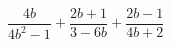 \begin{ex}[type=expression]
	\begin{condition}
		\( \dfrac{4b}{4b^2-1}+\dfrac{2b+1}{3-6b}+\dfrac{2b-1}{4b+2} \)
	\end{condition}
\end{ex}